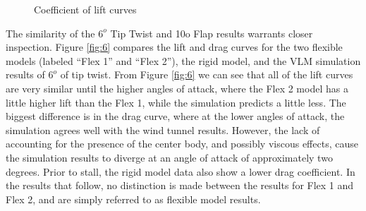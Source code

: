 \documentclass[11pt]{ucthesis}
\begin{document}
\begin{figure}[h]
\hfill
{}
\hfill
{}
\hfill
\caption{Coefficient of lift curves}
\label{fig:CL}
\end{figure}

The similarity of the $6^o$ Tip Twist and 10o Flap results warrants closer inspection. Figure \ref{fig:6} compares the lift and drag curves for the two flexible models (labeled “Flex 1” and “Flex 2”), the rigid model, and the VLM simulation results of $6^o$ of tip twist. From Figure \ref{fig:6} we can see that all of the lift curves are very similar until the higher angles of attack, where the Flex 2 model has a little higher lift than the Flex 1, while the simulation predicts a little less. The biggest difference is in the drag curve, where at the lower angles of attack, the simulation agrees well with the wind tunnel results. However, the lack of accounting for the presence of the center body, and possibly viscous effects, cause the simulation results to diverge at an angle of attack of approximately two degrees. Prior to stall, the rigid model data also show a lower drag coefficient.  In the results that follow, no distinction is made between the results for Flex 1 and Flex 2, and are simply referred to as flexible model results.
\end{document}

